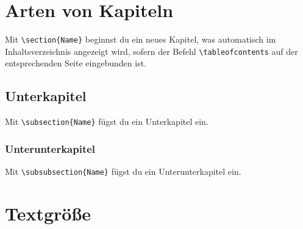 \documentclass[12pt, a4paper]{article} %
\begin{document}
\section{Arten von Kapiteln}

Mit \verb|\section{Name}| beginnst du ein neues Kapitel, was automatisch im Inhaltsverzeichnis angezeigt wird, sofern der Befehl \verb|\tableofcontents| auf der entsprechenden Seite eingebunden ist.

\subsection{Unterkapitel}

Mit \verb|\subsection{Name}| f\"ugst du ein Unterkapitel ein.

\subsubsection{Unterunterkapitel}

Mit \verb|\subsubsection{Name}| f\"ugst du ein Unterunterkapitel ein.

\section{Textgr\"o\ss e}
\label{sec:Textgr\"o\ss e}



\end{document}
